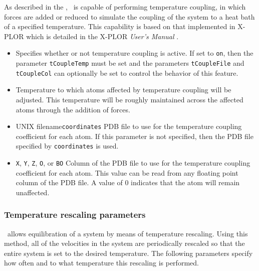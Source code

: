As described in the \PG, \NAMD\ is capable
of performing temperature coupling, in which forces are added or 
reduced to simulate the coupling of the system to a heat bath 
of a specified temperature.  
This capability is based on that implemented in X-PLOR which is detailed
in the X-PLOR {\it User's Manual} .

\begin{itemize}

\item
{}
{Specifies whether or not temperature coupling is active.  
If set to \verb!on!, then the parameter \verb!tCoupleTemp! must be set and 
the parameters \verb!tCoupleFile! and \verb!tCoupleCol! can 
optionally be set to control the behavior of this feature.} 

\item
{}
{Temperature to which atoms affected 
by temperature coupling will be adjusted.  
This temperature will be roughly maintained across the affected atoms 
through the addition of forces.}

\item
{}%
{UNIX filename}{\verb!coordinates!}%
{PDB file to use for the temperature coupling coefficient for each atom.  
If this parameter is not specified, then 
the PDB file specified by \verb!coordinates! is used.} 

\item
{}
{\verb!X!, \verb!Y!, \verb!Z!, \verb!O!, or \verb!B!}{\verb!O!} 
{Column of the PDB file to use for the temperature coupling coefficient for 
each atom.  This value can be read from any 
floating point column of the PDB file.  
A value of $0$ indicates that the atom will remain unaffected.}

\end{itemize}

\subsubsection{Temperature rescaling parameters}

\NAMD\ allows equilibration of a system by means of temperature 
rescaling.  Using this method, all of the velocities in the system 
are periodically rescaled so that the entire system is set to the 
desired temperature.  The following parameters specify how often 
and to what temperature this rescaling is performed.  

